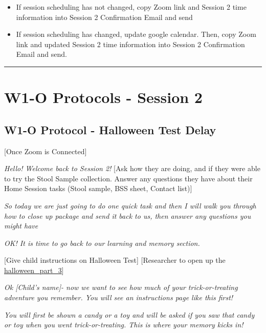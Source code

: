 \documentclass[]{book}
\providecommand{\tightlist}{%
  \setlength{\itemsep}{0pt}\setlength{\parskip}{0pt}}
\begin{document}
\begin{itemize}
\tightlist
\item
  If session scheduling has not changed, copy Zoom link and Session 2 time information into Session 2 Confirmation Email and send
\item
  If session scheduling has changed, update google calendar. Then, copy Zoom link and updated Session 2 time information into Session 2 Confirmation Email and send.
\end{itemize}

\begin{center}\rule{0.5\linewidth}{0.5pt}\end{center}

\hypertarget{w1-o-protocols---session-2}{%
\section{W1-O Protocols - Session 2}\label{w1-o-protocols---session-2}}

\hypertarget{w1-o-protocol---halloween-test-delay}{%
\subsection{W1-O Protocol - Halloween Test Delay}\label{w1-o-protocol---halloween-test-delay}}

{[}Once Zoom is Connected{]}

\emph{Hello! Welcome back to Session 2!} {[}Ask how they are doing, and if they were able to try the Stool Sample collection. Answer any questions they have about their Home Session tasks (Stool sample, BSS sheet, Contact list){]}

\emph{So today we are just going to do one quick task and then I will walk you through how to close up package and send it back to us, then answer any questions you might have}

\emph{OK! It is time to go back to our learning and memory section.}

{[}Give child instructions on Halloween Test{]} {[}Researcher to open up the \href{https://ucla.app.box.com/file/737558206552}{halloween\_part\_3}{]}

\emph{Ok {[}Child's name{]}- now we want to see how much of your trick-or-treating adventure you remember. You will see an instructions page like this first!}

\emph{You will first be shown a candy or a toy and will be asked if you saw that candy or toy when you went trick-or-treating. This is where your memory kicks in!}
\end{document}
